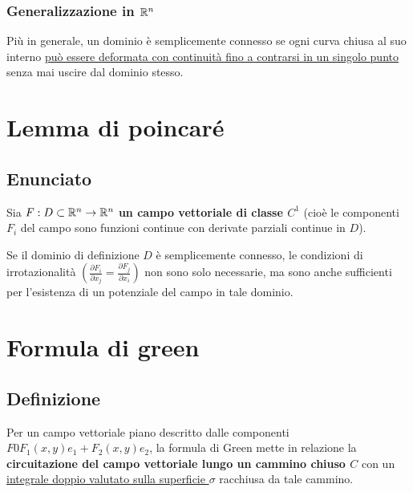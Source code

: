 \subsubsection{Generalizzazione in $\mathbb{R}^n$}
Più in generale, un dominio è semplicemente connesso se ogni curva chiusa al suo interno \uline{può essere deformata con continuità fino a contrarsi in un singolo punto} senza mai uscire dal dominio stesso.

\section{Lemma di poincaré}
\subsection{Enunciato}
Sia $F:D \subset \mathbb{R}^n \to \mathbb{R}^n$ \textbf{un campo vettoriale di classe $C^1$} (cioè le componenti $F_{i}$ del campo sono funzioni continue con derivate parziali continue in $D$).

Se il dominio di definizione $D$ è semplicemente connesso, le condizioni di irrotazionalità $(\frac{\partial F_{i}}{\partial x_{j}} = \frac{\partial F_{j}}{\partial x_{i}})$ non sono solo necessarie, ma sono anche sufficienti per l'esistenza di un potenziale del campo in tale dominio.

\section{Formula di green}
\subsection{Definizione}
Per un campo vettoriale piano descritto dalle componenti $F 0 F_{1}(x,y)e_{1} + F_{2}(x,y)e_{2}$, la formula di Green mette in relazione la \textbf{circuitazione del campo vettoriale lungo un cammino chiuso $C$} con un \uline{integrale doppio valutato sulla superficie $\sigma$} racchiusa da tale cammino.

